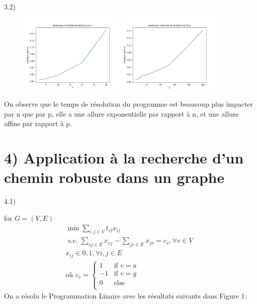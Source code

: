 \documentclass[11pt,A4,french]{article}
\begin{document}
3.2)
\begin{figure}[h!]
    \centering
    \includegraphics[max width=0.45\textwidth]{images/32_n.png}
    \includegraphics[max width=0.45\textwidth]{images/32_p.png}
\end{figure}

On observe que le temps de résolution du programme est beaucoup plus impacter par n que par p, elle a une allure exponentielle par rapport à n, et une allure affine par rapport à p.

\section*{4) Application à la recherche d'un chemin robuste dans un graphe}

4.1) 

for $G=(V,E)$ 
$$
\begin{gathered}
\min \sum_{i,j\in V} t_{ij}x_{ij} \\
\text { s.c. }
\sum_{vj \in E} x_{vj} - \sum_{jv \in E} x_{jv} = c_v , \forall v \in V \\
x_{i j} \in {0,1}, \forall i,j \in E \\
\text{où } c_v = \begin{cases}
    1 &\text{if } v=a\\
    -1 &\text{if } v=g\\
    0 &\text{else}\\
\end{cases}
\end{gathered}
$$
On a résolu le Programmation Linaire avec les résultats suivants dans Figure 1:
\end{document}
